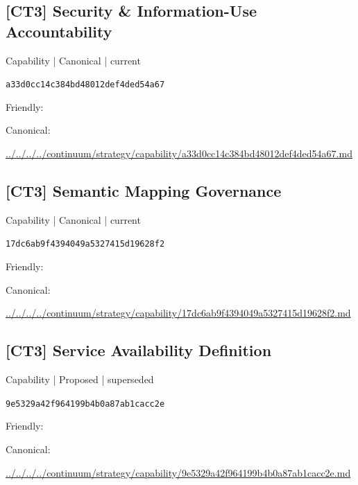 \documentclass[10pt,a4paper]{article}
\begin{document}
\subsection*{[CT3] Security \& Information-Use Accountability}
{\small Capability | Canonical | current}\par
\texttt{a33d0cc14c384bd48012def4ded54a67}\par
Friendly: \par
Canonical: \par
{\footnotesize\url{../../../../continuum/strategy/capability/a33d0cc14c384bd48012def4ded54a67.md}}\par
\subsection*{[CT3] Semantic Mapping Governance}
{\small Capability | Canonical | current}\par
\texttt{17dc6ab9f4394049a5327415d19628f2}\par
Friendly: \par
Canonical: \par
{\footnotesize\url{../../../../continuum/strategy/capability/17dc6ab9f4394049a5327415d19628f2.md}}\par
\subsection*{[CT3] Service Availability Definition}
{\small Capability | Proposed | superseded}\par
\texttt{9e5329a42f964199b4b0a87ab1cacc2e}\par
Friendly: \par
Canonical: \par
{\footnotesize\url{../../../../continuum/strategy/capability/9e5329a42f964199b4b0a87ab1cacc2e.md}}\par
\end{document}
